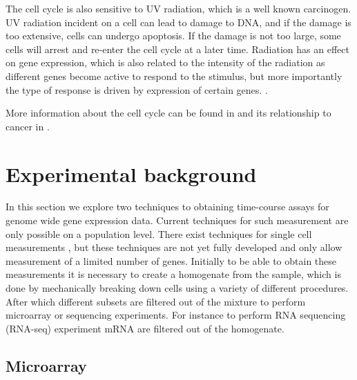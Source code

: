 The cell cycle is also sensitive to UV radiation, which is a well known carcinogen. UV radiation incident on a cell can lead to damage to DNA, and if the damage is too extensive, cells can undergo apoptosis. If the damage is not too large, some cells will arrest and re-enter the cell cycle at a later time. Radiation has an effect on gene expression, which is also related to the intensity of the radiation as different genes become active to respond to the stimulus, but more importantly the type of response is driven by expression of certain genes. \citep{Gentile:2003in}.

More information about the cell cycle can be found in \citet[Chapter~17]{Alberts:2007tv} and its relationship to cancer in \citet[Chapter~8]{Weinberg:2013uu}.


\section{Experimental background}
\label{sec:exper-backgr}

In this section we explore two techniques to obtaining time-course assays for genome wide gene expression data. Current techniques for such measurement are only possible on a population level. There exist techniques for single cell measurements \citep{Buganim:2012hp}, but these techniques are not yet fully developed and only allow measurement of a limited number of genes. Initially to be able to obtain these measurements it is necessary to create a homogenate from the sample, which is done by mechanically breaking down cells using a variety of different procedures.  After which different subsets are filtered out of the mixture to perform microarray or sequencing experiments.  For instance to perform RNA sequencing (RNA-seq) experiment mRNA are filtered out of the homogenate.

\subsection{Microarray}
\label{sec:microarray}

